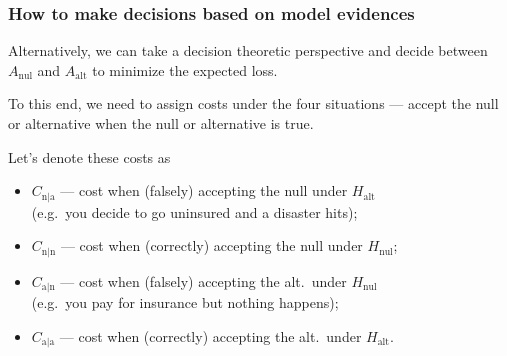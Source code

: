\documentclass[18pt]{beamer}
\newenvironment{tightItemize}[1][]{%
  \vspace{-.3\baselineskip}%
  \begin{itemize}[#1]
  \addtolength\itemsep{-.1\baselineskip}
}{
  \end{itemize}
}
\newcommand{\hypothesis}{H}
\renewcommand{\action}{A}
\newcommand{\nullSub}{\mathrm{nul}}
\newcommand{\altSub}{\mathrm{alt}}
\begin{document}
\begin{frame}
\frametitle{How to make decisions based on model evidences}
Alternatively, we can take a decision theoretic perspective and decide between $\action_\nullSub$ and $\action_\altSub$ to minimize the expected loss. 

\pause
To this end, we need to assign costs under the four situations --- accept the null or alternative when the null or alternative is true. 

\pause
Let's denote these costs as 
\begin{tightItemize}
\item $C_{\mathrm{n | a}}$ --- cost when (falsely) accepting the null under $\hypothesis_\altSub$ \\
	 (e.g.\ you decide to go uninsured and a disaster hits);
\item $C_{\mathrm{n | n}}$ --- cost when (correctly) accepting the null under $\hypothesis_\nullSub$; 
\pause
\item $C_{\mathrm{a | n}}$ --- cost when (falsely) accepting the alt.\ under $\hypothesis_\nullSub$ \\
	 (e.g.\ you pay for insurance but nothing happens);
\item $C_{\mathrm{a | a}}$ --- cost when (correctly) accepting the alt.\ under $\hypothesis_\altSub$.
\end{tightItemize}
\end{frame}
\end{document}
